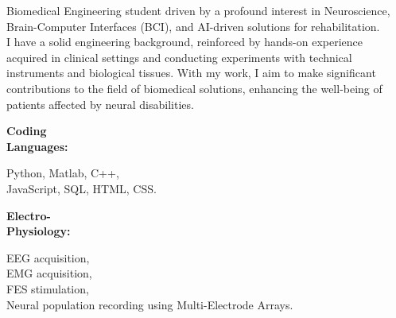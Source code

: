 \documentclass[9pt]{developercv} %
\begin{document}

\begin{minipage}[t]{0.55\textwidth}
	\vspace{-6pt}
 
    Biomedical Engineering student driven by a profound interest in Neuroscience, Brain-Computer Interfaces (BCI), and AI-driven solutions for rehabilitation.\\  
    I have a solid engineering background, reinforced by hands-on experience acquired in clinical settings and conducting experiments with technical instruments and biological tissues. With my work, I aim to make significant contributions to the field of biomedical solutions, enhancing the well-being of patients affected by neural disabilities.
	
\end{minipage}
\hfill %
\begin{minipage}[t]{0.405\textwidth}
    \vspace{-6pt}
    
    \begin{minipage}[t]{0.27\textwidth}
        \textbf{Coding \\ Languages:}
    \end{minipage}
    \hfill
    \begin{minipage}[t]{0.70\textwidth}
      Python, Matlab, C++, \\ JavaScript, SQL, HTML, CSS.
    \end{minipage}
    \vspace{4mm}
    
    \begin{minipage}[t]{0.27\textwidth}
        \textbf{Electro-\\ Physiology:}
    \end{minipage}
    \hfill
    \begin{minipage}[t]{0.70\textwidth}
      EEG acquisition,\\ EMG acquisition,\\ FES stimulation,\\ Neural population recording using Multi-Electrode Arrays.
    \end{minipage}
    
\end{minipage}
\end{document}
